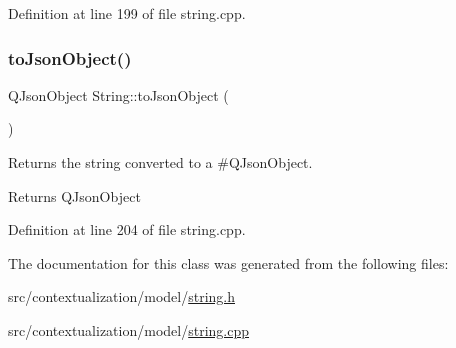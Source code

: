 Definition at line 199 of file string.\+cpp.

\mbox{\label{classString_a44e35d48e6bf3efe128d3855d242a131}} 
\subsubsection{\texorpdfstring{to\+Json\+Object()}{toJsonObject()}}
{\footnotesize\ttfamily Q\+Json\+Object String\+::to\+Json\+Object (\begin{DoxyParamCaption}{ }\end{DoxyParamCaption})}



Returns the string converted to a \#\+Q\+Json\+Object. 

\begin{DoxyReturn}{Returns}
Q\+Json\+Object 
\end{DoxyReturn}


Definition at line 204 of file string.\+cpp.



The documentation for this class was generated from the following files\+:\begin{DoxyCompactItemize}
\item 
src/contextualization/model/\mbox{\hyperlink{string_8h}{string.\+h}}\item 
src/contextualization/model/\mbox{\hyperlink{string_8cpp}{string.\+cpp}}\end{DoxyCompactItemize}

